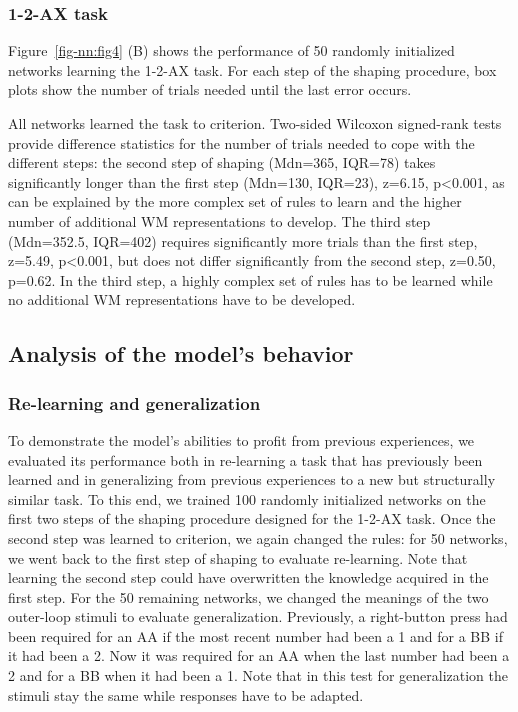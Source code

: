 \documentclass[
  11pt,
  a4paper,
]{scrbook}
\begin{document}
\subsubsection*{1-2-AX task}\label{ax-task-1}

Figure~\ref{fig-nn:fig4} (B) shows the performance of 50 randomly
initialized networks learning the 1-2-AX task. For each step of the
shaping procedure, box plots show the number of trials needed until the
last error occurs.

All networks learned the task to criterion. Two-sided Wilcoxon
signed-rank tests provide difference statistics for the number of trials
needed to cope with the different steps: the second step of shaping
(Mdn=365, IQR=78) takes significantly longer than the first step
(Mdn=130, IQR=23), z=6.15, p\textless0.001, as can be explained by the
more complex set of rules to learn and the higher number of additional
WM representations to develop. The third step (Mdn=352.5, IQR=402)
requires significantly more trials than the first step, z=5.49,
p\textless0.001, but does not differ significantly from the second step,
z=0.50, p=0.62. In the third step, a highly complex set of rules has to
be learned while no additional WM representations have to be developed.

\subsection{Analysis of the model's behavior}\label{sec-nn:analysis}

\subsubsection*{Re-learning and
generalization}\label{re-learning-and-generalization}

To demonstrate the model's abilities to profit from previous
experiences, we evaluated its performance both in re-learning a task
that has previously been learned and in generalizing from previous
experiences to a new but structurally similar task. To this end, we
trained 100 randomly initialized networks on the first two steps of the
shaping procedure designed for the 1-2-AX task. Once the second step was
learned to criterion, we again changed the rules: for 50 networks, we
went back to the first step of shaping to evaluate re-learning. Note
that learning the second step could have overwritten the knowledge
acquired in the first step. For the 50 remaining networks, we changed
the meanings of the two outer-loop stimuli to evaluate generalization.
Previously, a right-button press had been required for an AA if the most
recent number had been a 1 and for a BB if it had been a 2. Now it was
required for an AA when the last number had been a 2 and for a BB when
it had been a 1. Note that in this test for generalization the stimuli
stay the same while responses have to be adapted.
\end{document}
